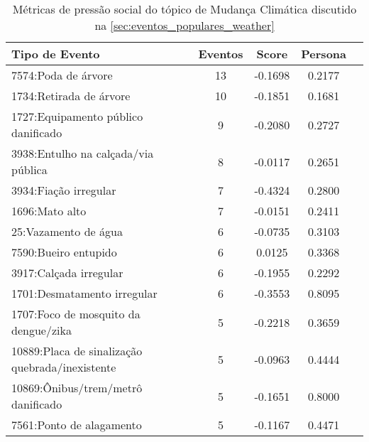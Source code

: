 \begin{table}[htbp]
	\centering
	\caption{Métricas de pressão social do tópico de Mudança Climática discutido na \autoref{sec:eventos_populares_weather}}
	\label{tab:eventos_populares_weather}
	\begin{tabular}{|l|c|c|c|c|}
		\hline
		\textbf{Tipo de Evento}                         & \textbf{Eventos} & \textbf{Score} & \textbf{Persona} \\
		\hline
		7574:Poda de árvore                             & 13               & -0.1698        & 0.2177           \\
		\hline
		1734:Retirada de árvore                         & 10               & -0.1851        & 0.1681           \\
		\hline
		1727:Equipamento público danificado             & 9                & -0.2080        & 0.2727           \\
		\hline
		3938:Entulho na calçada/via pública             & 8                & -0.0117        & 0.2651           \\
		\hline
		3934:Fiação irregular                           & 7                & -0.4324        & 0.2800           \\
		\hline
		1696:Mato alto                                  & 7                & -0.0151        & 0.2411           \\
		\hline
		25:Vazamento de água                            & 6                & -0.0735        & 0.3103           \\
		\hline
		7590:Bueiro entupido                            & 6                & 0.0125         & 0.3368           \\
		\hline
		3917:Calçada irregular                          & 6                & -0.1955        & 0.2292           \\
		\hline
		1701:Desmatamento irregular                     & 6                & -0.3553        & 0.8095           \\
		\hline
		1707:Foco de mosquito da dengue/zika            & 5                & -0.2218        & 0.3659           \\
		\hline
		10889:Placa de sinalização quebrada/inexistente & 5                & -0.0963        & 0.4444           \\
		\hline
		10869:Ônibus/trem/metrô danificado              & 5                & -0.1651        & 0.8000           \\
		\hline
		7561:Ponto de alagamento                        & 5                & -0.1167        & 0.4471           \\

\end{tabular}
\end{table}
